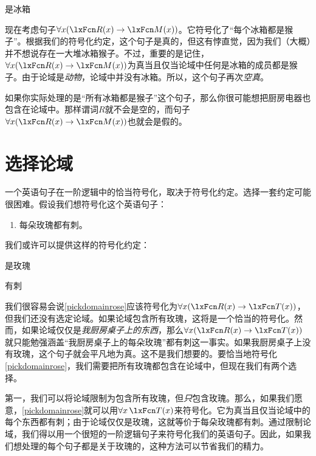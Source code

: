 \begin{ekey}
		\item[\atom{R}{x}] 是冰箱
	\end{ekey}


现在考虑句子$\forall x(\atom{R}{x} \eif \atom{M}{x})$。它符号化了“每个冰箱都是猴子”。根据我们的符号化约定，这个句子是真的，但这有悖直觉，因为我们（大概）并不想说存在一大堆冰箱猴子。不过，重要的是记住，$\forall x(\atom{R}{x} \eif \atom{M}{x})$为真当且仅当论域中任何是冰箱的成员都是猴子。由于论域是\emph{动物}，论域中并没有冰箱。所以，这个句子再次\emph{空真}。

如果你实际处理的是“所有冰箱都是猴子”这个句子，那么你很可能想把厨房电器也包含在论域中。那样谓词$R$就不会是空的，而句子$\forall x(\atom{R}{x} \eif \atom{M}{x})$也就会是假的。

\section{选择论域}
一个英语句子在一阶逻辑中的恰当符号化，取决于符号化约定。选择一套约定可能很困难。假设我们想符号化这个英语句子：


\begin{enumerate}
		\item\label{pickdomainrose} 每朵玫瑰都有刺。
	\end{enumerate}


我们或许可以提供这样的符号化约定：


\begin{ekey}
		\item[\atom{R}{x}] 是玫瑰
		\item[\atom{T}{x}] 有刺
	\end{ekey}


我们很容易会说\cref*{pickdomainrose}应该符号化为$\forall x(\atom{R}{x} \eif \atom{T}{x})$，但我们还没有选定论域。如果论域包含所有玫瑰，这将是一个恰当的符号化。然而，如果论域仅仅是\emph{我厨房桌子上的东西}，那么$\forall x(\atom{R}{x} \eif \atom{T}{x})$就只能勉强涵盖“我厨房桌子上的每朵玫瑰”都有刺这一事实。如果我厨房桌子上没有玫瑰，这个句子就会平凡地为真。这不是我们想要的。要恰当地符号化\cref*{pickdomainrose}，我们需要把所有玫瑰都包含在论域中，但现在我们有两个选择。

第一，我们可以将论域限制为包含所有玫瑰，但\emph{只}包含玫瑰。那么，如果我们愿意，\cref*{pickdomainrose}就可以用$\forall x\,\atom{T}{x}$来符号化。它为真当且仅当论域中的每个东西都有刺；由于论域仅仅是玫瑰，这就等价于每朵玫瑰都有刺。通过限制论域，我们得以用一个很短的一阶逻辑句子来符号化我们的英语句子。因此，如果我们想处理的每个句子都是关于玫瑰的，这种方法可以节省我们的精力。

